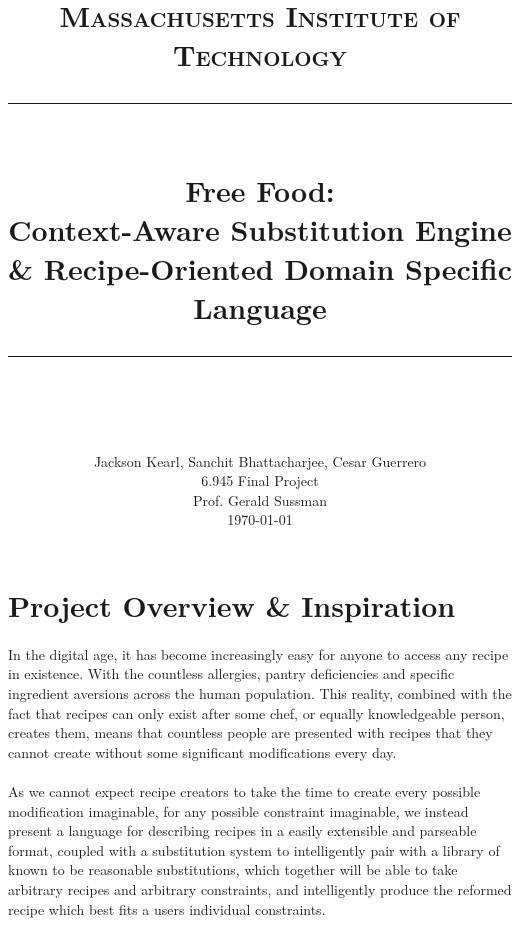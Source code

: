 \newcommand{\horrule}[1]{\rule{\linewidth}{#1}} 	%
\newcommand{\code}[1]{\texttt{#1}}

\title{
		\normalfont \normalsize \textsc{Massachusetts Institute of Technology} \\ [25pt]
		\horrule{0.5pt} \\[0.4cm]
		\huge Free Food: \\Context-Aware Substitution Engine \& Recipe-Oriented Domain Specific Language \\
		\horrule{2pt} \\[0.5cm]
}
\author{
		\normalfont 								\normalsize
        Jackson Kearl, Sanchit Bhattacharjee, Cesar Guerrero\\[-3pt]		\normalsize
        6.945 Final Project \\[-3pt] \normalsize
        Prof. Gerald Sussman \\[-3pt] \normalsize
        \today \normalsize
        \\
}
\date{}



\maketitle
\newpage
\section{Project Overview \& Inspiration}
\paragraph{}
In the digital age, it has become increasingly easy for anyone to access any recipe in existence. With the countless allergies, pantry deficiencies and specific ingredient aversions across the human population. This reality, combined with the fact that recipes can only exist after some chef, or equally knowledgeable person, creates them, means that countless people are presented with recipes that they cannot create without some significant modifications every day.

\paragraph{}
As we cannot expect recipe creators to take the time to create every possible modification imaginable, for any possible constraint imaginable, we instead present a language for describing recipes in a easily extensible and parseable format, coupled with a substitution system to intelligently pair with a library of known to be reasonable substitutions, which together will be able to take arbitrary recipes and arbitrary constraints, and intelligently produce the reformed recipe which best fits a users individual constraints.

